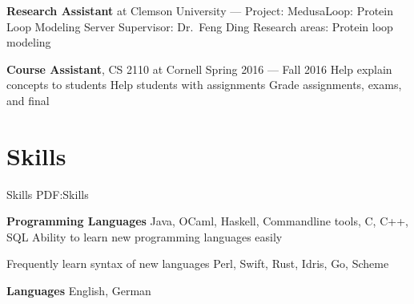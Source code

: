 \documentclass[letterpaper,10pt,oneside]{simpleresumecv}
\begin{document}
\begin{minipage}[t][0pt]{\linewidth}
\begin{body}
\textbf{Research Assistant} at Clemson University
\hfill
{} --- 
\BulletItem%
Project:
MedusaLoop: Protein Loop Modeling Server
\BulletItem%
Supervisor:
Dr.\ Feng Ding
\BulletItem%
Research areas:
Protein loop modeling

\textbf{Course Assistant}, CS 2110 at Cornell
\hfill
Spring 2016 --- Fall 2016
\BulletItem%
Help explain concepts to students
\BulletItem%
Help students with assignments
\BulletItem%
Grade assignments, exams, and final

\section%
{Skills}
{Skills}
{PDF:Skills}

\textbf{Programming Languages}
\BulletItem%
Java, OCaml, Haskell, Commandline tools, C, C++, SQL
\BulletItem%
Ability to learn new programming languages easily
\begin{detail}
\SubBulletItem%
Frequently learn syntax of new languages
\SubBulletItem%
Perl, Swift, Rust, Idris, Go, Scheme
\end{detail}
\textbf{Languages}
\BulletItem%
English, German
\end{body}

\end{minipage}
\end{document}
